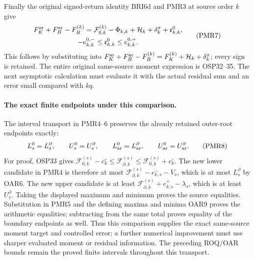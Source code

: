\documentclass[11pt,a4paper]{article}
\begin{document}
Finally the original signed-return identity BRI6d and PMR3 at
source order $k$ give
\[
 \begin{gathered}
 F_K^{\rm ar}+F_B^{\rm ar}-F_B^{(k)}
   =\mathcal F_{0,k}^{(k)}-\Phi_{k,k}
      +\mathcal H_k+\delta_k^\sigma+\mathfrak e^0_{k,k},\\
 -e_{k,k}^{0,-}\le\mathfrak e^0_{k,k}\le e_{k,k}^{0,+}.
 \end{gathered}\tag{PMR7}
\]
This follows by substituting into
$F_K^{\rm ar}+F_B^{\rm ar}-F_B^{(k)}=F_K^{(k)}+
\mathcal H_k+\delta_k^\sigma$; every sign is retained.
The entire original same-source moment expression is OSP32--35.
The next asymptotic calculation must evaluate it with the actual
residual sum and an error small compared with $kq$.

\paragraph{The exact finite endpoints under this comparison.}
The interval transport in PMR4--6 preserves the already retained
outer-root endpoints exactly:
\[
 L_s^0=L_s^\partial,\qquad U_s^0=U_s^\partial,\qquad
 L_{\rm ar}^0=L_{\rm ar}^\partial,\qquad
 U_{\rm ar}^0=U_{\rm ar}^\partial.
 \tag{PMR8}
\]
For proof, OSP33 gives
$\mathcal F_{0,k}^{(s)}-c_k^\circ\le\mathcal F_{\partial,k}^{(s)}
\le\mathcal F_{0,k}^{(s)}+c_k^\circ$.
The new lower candidate in PMR4 is therefore at most
$\mathcal F_{\partial,k}^{(s)}-e_{k,s}^--V_s$, which is at
most $L_s^\partial$ by OAR6. The new upper candidate is at
least $\mathcal F_{\partial,k}^{(s)}+e_{k,s}^+-\lambda_s$,
which is at least $U_s^\partial$. Taking the displayed maximum
and minimum proves the source equalities. Substitution in PMR5
and the defining maxima and minima OAR9 proves the arithmetic
equalities; subtracting from the same total proves equality of
the boundary endpoints as well. Thus this comparison supplies
the exact same-source moment target and controlled error; a
further numerical improvement must use sharper evaluated moment
or residual information. The preceding ROQ/OAR bounds remain
the proved finite intervals throughout this transport.

\end{document}
